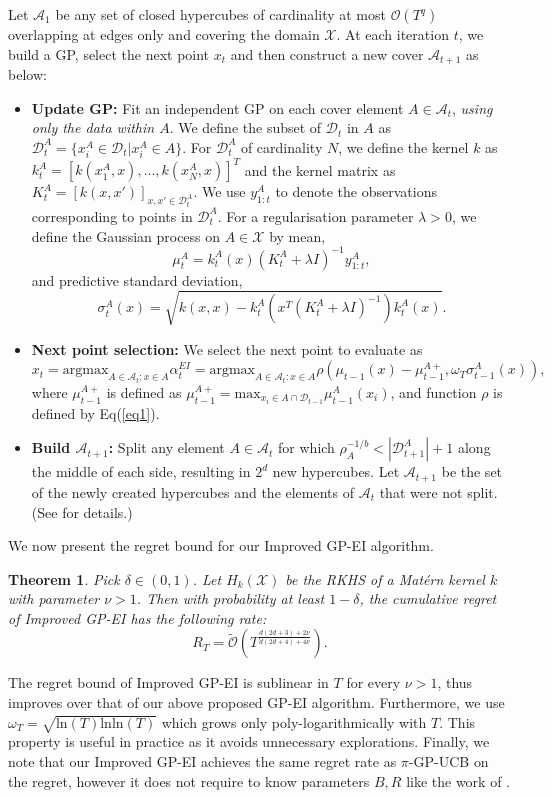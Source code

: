 \documentclass[twoside]{article}
\newtheorem{theorem}{Theorem}
\begin{document}
Let $\mathcal A_1$ be any set of closed hypercubes of cardinality at most $\mathcal O(T^q)$ overlapping at edges only and covering the domain $\mathcal X$. At each iteration $t$, we build a GP, select the next point $x_t$ and then construct a new cover $\mathcal A_{t+1}$ as below:
\begin{itemize}
  \item \textbf{Update GP:} Fit an independent GP on each cover element $A \in \mathcal A_t$, \emph{using only the data within $A$}. We define the subset of $\mathcal D_t$ in $A$ as $\mathcal D^A_t = \{x^A_i \in \mathcal D_t| x_i^A \in A\}$. For $\mathcal D^A_t$ of cardinality $N$, we define the kernel $k$ as $k^A_t = [k(x^A_1, x), ..., k(x^A_N, x)]^T$ and the kernel matrix as $K^A_t = [k(x, x')]_{x, x' \in \mathcal D^A_t}$. We use $y^A_{1:t}$ to denote the observations corresponding to points in $\mathcal D^A_t$. For a regularisation parameter $\lambda > 0$, we define the Gaussian process on $A \in \mathcal X$ by mean, $$\mu_t^A = k_t^A(x)(K^A_t + \lambda I)^{-1} y^A_{1:t},$$
         and predictive standard deviation,
        $$\sigma^A_t(x) = \sqrt{k(x,x) - k_t^A(x^T(K_t^A + \lambda I)^{-1}) k_t^A(x)}.$$
   \item \textbf{Next point selection:}  We select the next point to evaluate as  $x_t = \text{argmax}_{A \in \mathcal A_t: x \in A}\alpha_t^{EI} =\text{argmax}_{A \in \mathcal A_t: x \in A} \rho(\mu_{t-1}(x) - \mu^{A+}_{t-1}, \omega_T \sigma^A_{t-1}(x)),$
      where $\mu^{A+}_{t-1}$ is defined as $\mu^{A+}_{t-1} = \text{max}_{x_i \in A \cap \mathcal D_{t-1}} \mu^A_{t-1} (x_i)$, and function $\rho$ is defined by Eq(\ref{eq1}).
  \item \textbf{Build $\mathcal A_{t+1}$:} Split any element $A \in \mathcal A_{t}$ for which $\rho_A^{-1/b} < |\mathcal D^A_{t+1}| +1$ along the middle of each side, resulting in $2^d$ new hypercubes. Let $\mathcal A_{t+1}$ be the set of the newly created hypercubes and the elements of $\mathcal A_{t}$ that were not split. (See \citep{janz20a} for details.)
\end{itemize}
We now present the regret bound for our Improved GP-EI algorithm.
\begin{theorem}
Pick $\delta \in (0,1)$.  Let $H_k(\mathcal X)$ be the RKHS
of a Mat\'ern kernel $k$ with parameter $\nu > 1$. Then with probability at least $1 - \delta$, the cumulative regret of Improved GP-EI has the following rate:
$$R_T = \tilde{\mathcal O}(T^{\frac{d(2d+3) + 2\nu}{d(2d+4) + 4\nu}}).$$
\label{theorem3}
\end{theorem}
The regret bound of Improved GP-EI is sublinear in $T$ for every $\nu > 1$, thus improves over that of our above proposed GP-EI algorithm. Furthermore, we use $\omega_T = \sqrt{\text{ln}(T)\text{ln} \text{ln}(T)}$ which grows only poly-logarithmically with $T$. This property is useful in practice as it avoids unnecessary explorations. Finally, we note that our Improved GP-EI achieves the same regret rate as $\pi$-GP-UCB \citep{janz20a} on the regret, however it does not require to know parameters $B, R$ like the work of \citet{janz20a}.
\end{document}
